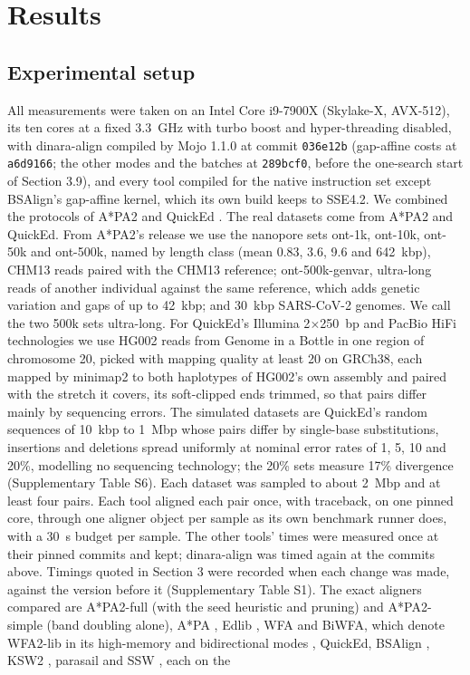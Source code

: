 \documentclass[nocrop,noinfo]{bioinfo}
\begin{document}
\section{Results}

\subsection{Experimental setup}

All measurements were taken on an Intel Core i9-7900X (Skylake-X, AVX-512), its ten cores at a fixed 3.3~GHz with turbo boost and hyper-threading disabled, with dinara-align compiled by Mojo 1.1.0 \citep{Modular2025mojo} at commit \texttt{036e12b} (gap-affine costs at \texttt{a6d9166}; the other modes and the batches at \texttt{289bcf0}, before the one-search start of Section 3.9), and every tool compiled for the native instruction set except BSAlign's gap-affine kernel, which its own build keeps to SSE4.2. We combined the protocols of A*PA2 \citep{GrootKoerkamp2024astarpa2} and QuickEd \citep{Doblas2025quicked}. The real datasets come from A*PA2 and QuickEd. From A*PA2's release \citep{GrootKoerkamp2024pabench} we use the nanopore sets ont-1k, ont-10k, ont-50k and ont-500k, named by length class (mean 0.83, 3.6, 9.6 and 642~kbp), CHM13 reads paired with the CHM13 reference; ont-500k-genvar, ultra-long reads of another individual against the same reference, which adds genetic variation and gaps of up to 42~kbp; and 30~kbp SARS-CoV-2 genomes. We call the two 500k sets ultra-long. For QuickEd's Illumina 2$\times$250~bp and PacBio HiFi technologies we use HG002 reads from Genome in a Bottle \citep{Zook2016giab} in one region of chromosome 20, picked with mapping quality at least 20 on GRCh38, each mapped by minimap2 \citep{Li2018minimap2} to both haplotypes of HG002's own assembly \citep{Hansen2025hg002} and paired with the stretch it covers, its soft-clipped ends trimmed, so that pairs differ mainly by sequencing errors. The simulated datasets are QuickEd's random sequences \citep{Doblas2024datasets} of 10~kbp to 1~Mbp whose pairs differ by single-base substitutions, insertions and deletions spread uniformly at nominal error rates of 1, 5, 10 and 20\%, modelling no sequencing technology; the 20\% sets measure 17\% divergence (Supplementary Table S6). Each dataset was sampled to about 2~Mbp and at least four pairs. Each tool aligned each pair once, with traceback, on one pinned core, through one aligner object per sample as its own benchmark runner does, with a 30~s budget per sample. The other tools' times were measured once at their pinned commits and kept; dinara-align was timed again at the commits above. Timings quoted in Section 3 were recorded when each change was made, against the version before it (Supplementary Table S1). The exact aligners compared are A*PA2-full (with the seed heuristic and pruning) and A*PA2-simple (band doubling alone), A*PA \citep{GrootKoerkamp2024astarpa}, Edlib \citep{Sosic2017edlib}, WFA and BiWFA, which denote WFA2-lib in its high-memory and bidirectional modes \citep{MarcoSola2021wfa,MarcoSola2023biwfa}, QuickEd, BSAlign \citep{Shao2024bsalign}, KSW2 \citep{Li2018minimap2}, parasail \citep{Daily2016parasail} and SSW \citep{Zhao2013ssw}, each on the 
\end{document}
